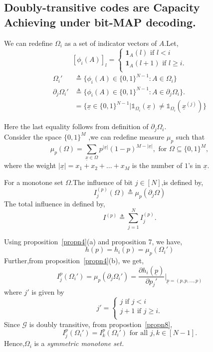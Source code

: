 \documentclass[
10pt, %
a4paper, %
oneside, %
headinclude,footinclude, %
BCOR5mm, %
]{scrartcl}
\begin{document}
\subsection*{Doubly-transitive codes are Capacity Achieving under bit-MAP decoding. }
\begin{definition}
We can redefine $\Omega_i$ as a set of indicator vectors of $A$.Let,
\[
    [\phi_i(A)]_l=\left\{
                \begin{array}{ll}
                  \mathbf{1}_A(l) \text{ if } l < i\\
                  \mathbf{1}_A(l+1) \text{ if } l \ge i.\\
                \end{array}
              \right.
  \]
\begin{align*}
\Omega_i' &\triangleq \{\phi_i(A) \in \{0,1\}^{N-1} : A \in \Omega_i\}\\
\partial_j\Omega_i' &\triangleq \{\phi_i(A) \in \{0,1\}^{N-1}: A \in \partial_j\Omega_i\}.\\& =\{\underline{x} \in \{0,1\}^{N-1} | \mathbb{1}_{\Omega_i}(\underline{x}) \neq  \mathbb{1}_{\Omega_i}(\underline{x}^{(j)})\}
\end{align*}
\label{defn13}
\end{definition}
Here the last equality follows from definition of $\partial_j\Omega_i$.\\
Consider the space $\{0,1\}^M$ ,we can redefine measure $\mu_p$ such that $$\mu_p(\Omega) = \sum_{\underline{x} \in \Omega} p^{|\underline{x}|}(1-p)^{M-|\underline{x}|}, \text{ for }\Omega \subseteq \{0,1\}^M,$$ where the weight $|\underline{x}| = x_1 + x_2 + \ldots + x_M$ is the number of $1$'s in $\underline{x}$. 
\begin{definition}
For a monotone set $\Omega$.The influence of bit $j \in [N]$,is defined by,
$$I_j^{(p)}(\Omega)\triangleq \mu_p(\partial_j\Omega)$$
The total influence in defined by,
$$I^{(p)}\triangleq \sum^N_{j=1}I_j^{(p)}.$$
\label{defn15}
\end{definition}
Using proposition~\ref{propn4}(a) and proposition 7, we have, 
$$h(p)=h_i(p)=\mu_p(\Omega_i')$$
Further,from proposition~\ref{propn4}(b), we get,
$$I_j^{p}(\Omega_i')=\mu_p(\partial_j\Omega_i') = \frac{\partial h_i(\underline{p})}{\partial p_j'}\Bigg|_{\underline{p}=(p,p,\ldots,p)}$$
where $j'$ is given by 
\[
    j'=\left\{
                \begin{array}{ll}
                  j \text{ if } j < i\\
                  j+1 \text{ if } j \ge i.\\
                \end{array}
              \right.
  \]
Since $\mathcal{G}$ is doubly transitive, from propostion~\ref{propn8}, $$I_j^{p}(\Omega_i') = I_k^{p}(\Omega_i') \text{ for all } j,k \in [N-1].$$
Hence,$\Omega_i$ is a \emph{symmetric monotone set.}
\end{document}
